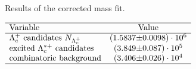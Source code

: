  
\begin{table}[h]
    \centering
    \caption{Results of the \Lc corrected mass fit.}
    \label{tab:fit_correctedMass}
    $\begin{array}{lr@{\pm}l}
    \hline
    \text{Variable} & \multicolumn{2}{c}{\text{Value}} \\
    \hline
        \text{\Lc candidates \NLc}&(1.5837 & 0.0098) \cdot 10^{6}\\
\text{excited \Lcstar candidates}&(3.849 & 0.087) \cdot 10^{5}\\
\text{combinatoric background}&(3.406 & 0.026) \cdot 10^{4}\\

\hline
\end{array}$
\end{table}
    